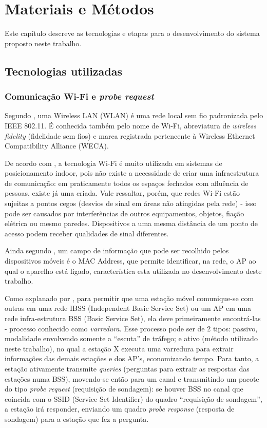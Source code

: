 
\chapter{Materiais e Métodos}
\label{metodologia}
Este capítulo descreve as tecnologias e etapas para o desenvolvimento
do sistema proposto neste trabalho.

\section{Tecnologias utilizadas}
\label{tecnologias-usadas}

\subsection{Comunicação Wi-Fi e \emph{probe request}}
\label{wifi}

Segundo , uma Wireless LAN (WLAN) é uma rede local sem
fio padronizada pelo IEEE 802.11. É conhecida também pelo nome de Wi-Fi,
abreviatura de \emph{wireless fidelity} (fidelidade sem fios) e marca registrada
pertencente à Wireless Ethernet Compatibility Alliance (WECA).

De acordo com , a tecnologia Wi-Fi é muito utilizada em
sistemas de posicionamento indoor, pois não existe a necessidade de criar uma
infraestrutura de comunicação: em praticamente todos os espaços fechados com
afluência de pessoas, existe já uma criada. Vale ressaltar, porém, que redes
Wi-Fi estão sujeitas a pontos cegos (desvios de sinal em áreas não atingidas
pela rede) - isso pode ser causados por interferências de outros equipamentos,
objetos, fiação elétrica ou mesmo paredes. Dispositivos a uma mesma distância de
um ponto de acesso podem receber qualidades de sinal diferentes.

Ainda segundo , um campo de informação que pode ser
recolhido pelos dispositivos móveis é o MAC Address, que permite identificar, na
rede, o AP ao qual o aparelho está ligado, característica esta utilizada no
desenvolvimento deste trabalho.

Como explanado por , para permitir que uma estação móvel
comunique-se com outras em uma rede IBSS (Independent Basic Service Set) ou um
AP em uma rede infra-estrutura BSS (Basic Service Set), ela deve primeiramente
encontrá-las - processo conhecido como \emph{varredura}. Esse processo pode ser de 2
tipos: passivo, modalidade envolvendo somente a ``escuta'' de tráfego; e ativo
(método utilizado neste trabalho), no qual a estação X executa uma varredura
para extrair informações das demais estações e dos AP’s, economizando tempo.
Para tanto, a estação ativamente transmite \emph{queries} (perguntas para
extrair as respostas das estações numa BSS), movendo-se então para um canal e
transmitindo um pacote do tipo \emph{probe request} (requisição de sondagem): se
houver BSS no canal que coincida com o SSID (Service Set Identifier) do quadro
``requisição de sondagem'', a estação irá responder, enviando um quadro
\emph{probe response} (resposta de sondagem) para a estação que fez a pergunta.

